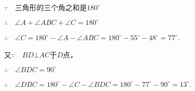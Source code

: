 \begin{figure}[htp]
	\centering
{}
	\caption{}
\end{figure}

\begin{solution}
$\because\quad $三角形的三个角之和是$180^{\circ}$

$\therefore\quad \angle A+\angle ABC+\angle C=180^{\circ}$

$\therefore\quad \angle C=180^{\circ}-\angle A-\angle ABC
=180^{\circ}-55^{\circ}-48^{\circ}=77^{\circ}$.

又$\because\quad BD\bot AC$于$D$点，

$\therefore\quad \angle BDC=90^{\circ}$

$\therefore\quad \angle DBC=180^{\circ}-\angle C-\angle BDC
=180^{\circ}-77^{\circ}-90^{\circ}=13^{\circ}$.
\end{solution}

